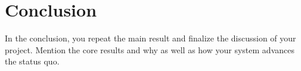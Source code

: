 \documentclass[a4paper,11pt,oneside]{report}
\begin{document}
\chapter{Conclusion}

In the conclusion, you repeat the main result and finalize the discussion of
your project. Mention the core results and why as well as how your system
advances the status quo.

\cleardoublepage
{}
{}
\printbibliography

%
%
\end{document}
